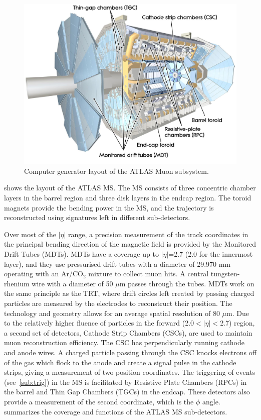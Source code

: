 \begin{figure}[!ht]
    \centering
    \includegraphics[width=0.7\linewidth]{figures/experiment/MuonSystem.png}
    \caption{Computer generator layout of the ATLAS Muon subsystem.~\cite{Pequenao:1095929}}
    \label{fig:ms}
\end{figure}

 shows the layout of the ATLAS MS. The MS consists of three concentric chamber layers in the barrel region and three disk layers in the endcap region. The toroid magnets provide the bending power in the MS, and the trajectory is reconstructed using signatures left in different sub-detectors. 

Over most of the $|\eta|$ range, a precision measurement of the track coordinates in the principal bending direction of the magnetic field is provided by the Monitored Drift Tubes (MDTs). MDTs have a coverage up to $|\eta|$=2.7 (2.0 for the innermost layer), and they use pressurised drift tubes with a diameter of 29.970 mm operating with an Ar/CO$_2$ mixture to collect muon hits. A central tungsten-rhenium wire with a diameter of 50 $\mu$m passes through the tubes. MDTs work on the same principle as the TRT, where drift circles left created by passing charged particles are measured by the electrodes to reconstruct their position. The technology and geometry allows for an average spatial resolution of 80 $\mu$m. Due to the relatively higher fluence of particles in the forward (2.0$<|\eta|<$2.7) region, a second set of detectors, Cathode Strip Chambers (CSCs), are used to maintain muon reconstruction efficiency. The CSC has perpendicularly running cathode and anode wires. A charged particle passing through the CSC knocks electrons off of the gas which flock to the anode and create a signal pulse in the cathode strips, giving a measurement of two position coordinates. The triggering of events (see~\cref{sub:trig}) in the MS is facilitated by Resistive Plate Chambers (RPCs) in the barrel and Thin Gap Chambers (TGCs) in the endcap. These detectors also provide a measurement of the second coordinate, which is the $\phi$ angle.~ summarizes the coverage and functions of the ATLAS MS sub-detectors.

